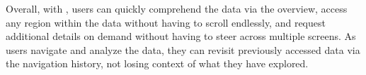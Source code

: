 Overall, with \noah, users can quickly
comprehend the data via the overview, access any region 
within the data without having to
scroll endlessly, and request additional details on demand without having to
steer across multiple screens. As users navigate and analyze the data, 
they can revisit previously accessed data via the navigation history, not losing context
of what they have explored. 





